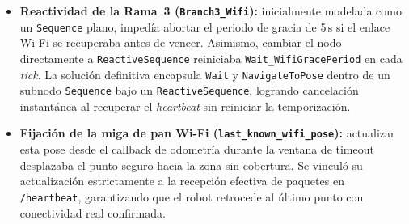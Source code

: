 \begin{itemize}
    \item \textbf{Reactividad de la Rama~3 (\texttt{Branch3\_Wifi}):} inicialmente modelada como un \texttt{Sequence} plano, impedía abortar el periodo de gracia de 5\,s si el enlace Wi-Fi se recuperaba antes de vencer. Asimismo, cambiar el nodo directamente a \texttt{ReactiveSequence} reiniciaba \texttt{Wait\_WifiGracePeriod} en cada \textit{tick}. La solución definitiva encapsula \texttt{Wait} y \texttt{NavigateToPose} dentro de un subnodo \texttt{Sequence} bajo un \texttt{ReactiveSequence}, logrando cancelación instantánea al recuperar el \textit{heartbeat} sin reiniciar la temporización.
    \item \textbf{Fijación de la miga de pan Wi-Fi (\texttt{last\_known\_wifi\_pose}):} actualizar esta pose desde el callback de odometría durante la ventana de timeout desplazaba el punto seguro hacia la zona sin cobertura. Se vinculó su actualización estrictamente a la recepción efectiva de paquetes en \texttt{/heartbeat}, garantizando que el robot retrocede al último punto con conectividad real confirmada.
\end{itemize}
